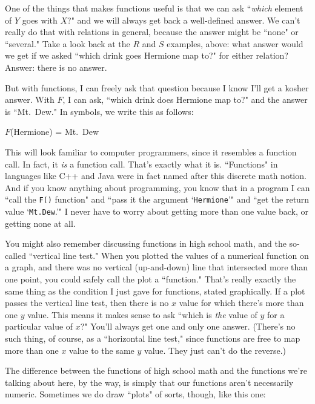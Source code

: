 One of the things that makes functions useful is that we can ask
``\textit{which} element of $Y$ goes with $X$?" and we will always get back
a well-defined answer. We can't really do that with relations in general,
because the answer might be ``none" or ``several." Take a look back at the
$R$ and $S$ examples, above: what answer would we get if we asked ``which
drink goes Hermione map to?" for either relation?  Answer: there is no
answer.

But with functions, I can freely ask that question because I know I'll get
a kosher answer. With $F$, I can ask, ``which drink does Hermione map to?"
and the answer is ``Mt.~Dew." In symbols, we write this as follows:

\begin{center}
$F$(Hermione) = Mt.~Dew
\end{center}

This will look familiar to computer programmers, since it resembles a
function call. In fact, it \textit{is} a function call. That's exactly what
it is. ``Functions" in languages like C++ and Java were in fact named after
this discrete math notion. And if you know anything about programming, you
know that in a program I can ``call the \texttt{F()} function" and ``pass
it the argument `\texttt{Hermione}'" and ``get the return value
`\texttt{Mt.Dew}.'" I never have to worry about getting more than one value
back, or getting none at all.

You might also remember discussing functions in high school math, and the
so-called ``vertical line test." When you plotted the values of a numerical
function on a graph, and there was no vertical (up-and-down) line that
intersected more than one point, you could safely call the plot a
``function." That's really exactly the same thing as the condition I just
gave for functions, stated graphically. If a plot passes the vertical line
test, then there is no $x$ value for which there's more than one $y$ value.
This means it makes sense to ask ``which is \textit{the} value of $y$ for a
particular value of $x$?" You'll always get one and only one answer.
(There's no such thing, of course, as a ``horizontal line test," since
functions are free to map more than one $x$ value to the same $y$ value.
They just can't do the reverse.)

The difference between the functions of high school math and the functions
we're talking about here, by the way, is simply that our functions aren't
necessarily numeric. Sometimes we do draw ``plots" of sorts, though, like
this one:

